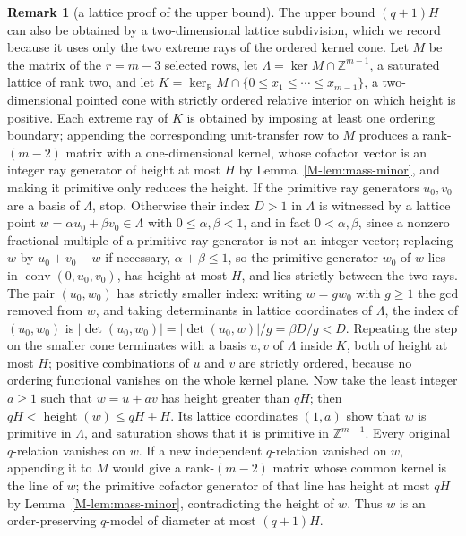 \documentclass[11pt,reqno]{amsart}
\theoremstyle{plain}
\theoremstyle{definition}
\theoremstyle{plain}
\newcommand{\R}{\mathbb{R}}
\newcommand{\Z}{\mathbb{Z}}
\newcommand{\height}{\operatorname{height}}
\newcommand{\conv}{\operatorname{conv}}
\theoremstyle{plain}
\theoremstyle{plain}
\theoremstyle{plain}
\theoremstyle{plain}
\theoremstyle{plain}
\theoremstyle{definition}
\theoremstyle{definition}
\newtheorem{Sremark}[Stheorem]{Remark}
\theoremstyle{definition}
\theoremstyle{plain}
\begin{document}
\begin{Sremark}[a lattice proof of the upper bound]\label{S-rem:lattice-proof}
The upper bound $(q+1)H$ can also be obtained by a two-dimensional lattice
subdivision, which we record because it uses only the two extreme rays of
the ordered kernel cone. Let $M$ be the matrix of the $r=m-3$ selected rows,
let $\Lambda=\ker M\cap\Z^{m-1}$, a saturated lattice of rank two, and let
$K=\ker_\R M\cap\{0\le x_1\le\cdots\le x_{m-1}\}$, a two-dimensional pointed
cone with strictly ordered relative interior on which height is positive.
Each extreme ray of $K$ is obtained by imposing at least one ordering
boundary; appending the corresponding unit-transfer row to $M$ produces a
rank-$(m-2)$ matrix with a one-dimensional kernel, whose cofactor vector is
an integer ray generator of height at most $H$ by Lemma~\ref{M-lem:mass-minor},
and making it primitive only reduces the height. If the primitive ray
generators $u_0,v_0$ are a basis of $\Lambda$, stop. Otherwise their index
$D>1$ in $\Lambda$ is witnessed by a lattice point
$w=\alpha u_0+\beta v_0\in\Lambda$ with $0\le\alpha,\beta<1$, and in fact
$0<\alpha,\beta$, since a nonzero fractional multiple of a primitive ray
generator is not an integer vector; replacing $w$ by $u_0+v_0-w$ if necessary,
$\alpha+\beta\le1$, so the primitive generator $w_0$ of $w$ lies in
$\conv(0,u_0,v_0)$, has height at most $H$, and lies strictly between the two
rays. The pair $(u_0,w_0)$ has strictly smaller index: writing $w=gw_0$ with
$g\ge1$ the gcd removed from $w$, and taking determinants in lattice
coordinates of $\Lambda$, the index of $(u_0,w_0)$ is
$|\det(u_0,w_0)|=|\det(u_0,w)|/g=\beta D/g<D$. Repeating the step
on the smaller cone terminates with a basis $u,v$ of $\Lambda$ inside $K$,
both of height at most $H$; positive combinations of $u$ and $v$ are strictly
ordered, because no ordering functional vanishes on the whole kernel plane.
Now take the least integer $a\ge1$ such that $w=u+av$ has height greater
than $qH$; then $qH<\height(w)\le qH+H$. Its lattice coordinates $(1,a)$ show
that $w$ is primitive in $\Lambda$, and saturation shows that it is primitive
in $\Z^{m-1}$. Every original $q$-relation vanishes on $w$. If a new
independent $q$-relation vanished on $w$, appending it to $M$ would give a
rank-$(m-2)$ matrix whose common kernel is the line of $w$; the primitive
cofactor generator of that line has height at most $qH$ by
Lemma~\ref{M-lem:mass-minor}, contradicting the height of $w$. Thus $w$ is an
order-preserving $q$-model of diameter at most $(q+1)H$.
\end{Sremark}
\end{document}
